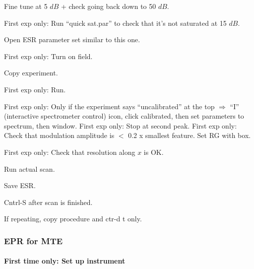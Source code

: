 Fine tune at 5 $dB$ + check going back down to 50 $dB$.

First exp only: Run ``quick sat.par'' to check that it's not saturated at 15 $dB$.

Open ESR parameter set similar to this one.

First exp only: Turn on field.

Copy experiment.

First exp only: Run.

First exp only: Only if the experiment says ``uncalibrated'' at the top $\Rightarrow$ ``I'' (interactive spectrometer control) icon, click calibrated, then set parameters to spectrum, then window.
First exp only: Stop at second peak.
First exp only: Check that modulation amplitude is $<$ 0.2 x smallest feature.
Set RG with box.

First exp only: Check that resolution along $x$ is OK.

Run actual scan.

Save ESR.





Cntrl-S after scan is finished.

If repeating, copy procedure and ctr-d t only.

\subsubsection{EPR for MTE}
\paragraph{First time only: Set up instrument}

